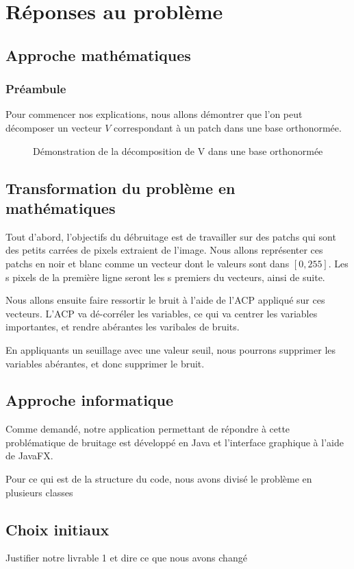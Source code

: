 \section{Réponses au problème}

\subsection{Approche mathématiques}
\subsubsection{Préambule}
Pour commencer nos explications, nous allons démontrer que l'on peut décomposer un vecteur \(V\) correspondant à un patch dans une base orthonormée.\newline
\begin{figure}[hbt!]
    
    \caption{Démonstration de la décomposition de V dans une base orthonormée}
\end{figure}

\subsection{Transformation du problème en mathématiques}
Tout d'abord, l'objectifs du débruitage est de travailler sur des patchs qui sont des petits carrées de pixels extraient de l'image. Nous allons représenter ces patchs en noir et blanc comme un vecteur dont le valeurs sont dans \([0,255]\). Les s pixels de la première ligne seront les s premiers du vecteurs, ainsi de suite. \par
Nous allons ensuite faire ressortir le bruit à l'aide de l'ACP appliqué sur ces vecteurs. L'ACP va dé-corréler les variables, ce qui va centrer les variables importantes, et rendre abérantes les varibales de bruits. \par
En appliquants un seuillage avec une valeur seuil, nous pourrons supprimer les variables abérantes, et donc supprimer le bruit.

\subsection{Approche informatique}
Comme demandé, notre application permettant de répondre à cette problématique de bruitage est développé en Java et l'interface graphique à l'aide de JavaFX. \par
Pour ce qui est de la structure du code, nous avons divisé le problème en plusieurs classes

\subsection{Choix initiaux}
Justifier notre livrable 1 et dire ce que nous avons changé